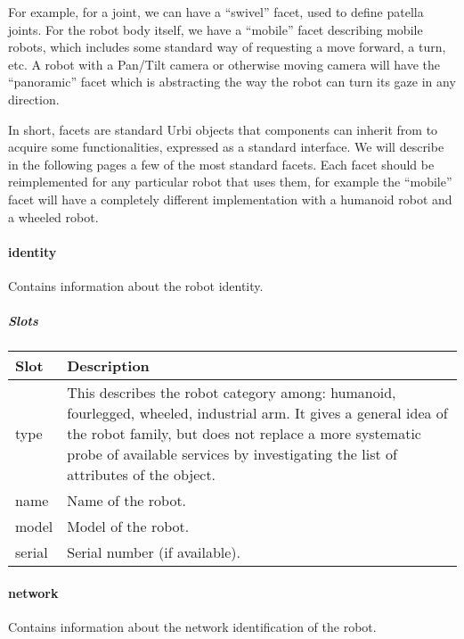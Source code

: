 \documentclass[a4paper]{article}
\begin{document}
{\sffamily
For example, for a joint, we can have a “swivel” facet, used to define
patella joints. For the robot body itself, we have a “mobile” facet
describing mobile robots, which includes some standard way of
requesting a move forward, a turn, etc. A robot with a Pan/Tilt camera
or otherwise moving camera will have the “panoramic” facet which is
abstracting the way the robot can turn its gaze in any direction.}

{\sffamily
In short, facets are standard Urbi objects that components can inherit
from to acquire some functionalities, expressed as a standard
interface. We will describe in the following pages a few of the most
standard facets. Each facet should be reimplemented for any particular
robot that uses them, for example the “mobile” facet will have a
completely different implementation with a humanoid robot and a wheeled
robot.}

\paragraph{identity}

{\sffamily
Contains information about the robot identity. }

\subparagraph{Slots}

\begin{flushleft}
\tablehead{}
\begin{supertabular}{|m{2.8669999cm}|m{12.472cm}|}
\hline
\sffamily\bfseries Slot &
\sffamily\bfseries Description\\\hline
type &
\sffamily This describes the robot category
among: humanoid, fourlegged, wheeled, industrial arm. It gives a
general idea of the robot family, but does not replace a more
systematic probe of available services by investigating the list of
attributes of the object.\\\hline
name &
\sffamily Name of the robot.\\\hline
model &
\sffamily Model of the robot.\\\hline
serial &
\sffamily Serial number (if available).\\\hline
\end{supertabular}
\end{flushleft}
\paragraph{network}

{\sffamily
Contains information about the network identification of the robot.}
\end{document}
